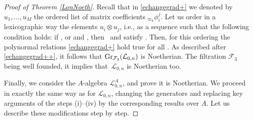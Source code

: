 \documentclass[10pt,a4paper]{amsart}
\numberwithin{equation}{section}
\theoremstyle{definition}
\newcommand{\Ll}{{\mathcal L}}
\begin{document}
\begin{proof}[Proof of Theorem \ref{LonNoeth}]
Recall that in \eqref{echangegrad+} we denoted by $u_1,\dots,u_M$ the ordered list of matrix coefficients ${}_{\varpi_k}\phi_{i}^{j}$. Let us order in a lexicographic way the elements $u_i\otimes u_j$, i.e., as a sequence  such that the following condition holds: if , or  and , then~ and  satisfy . Then, for this ordering the polynormal relations \eqref{echangegrad+} hold true for all . As described after \eqref{echangegrad++}, it follows that ${\rm Gr}_{\mathcal{F}_3}(\Ll_{0,n})$ is Noetherian. The filtration $\mathcal{F}_3$ being well founded, it implies that~$\Ll_{0,n}$ is Noetherian too.

Finally, we consider the $A$-algebra $\Ll_{0,n}^A$, and prove it is Noetherian. We proceed in exactly the same way as for $\Ll_{0,n}$, changing the generators and replacing key arguments of the steps (i)--(iv) by the corresponding results over $A$. Let us describe these modifications step by step.


\end{proof}
\end{document}
